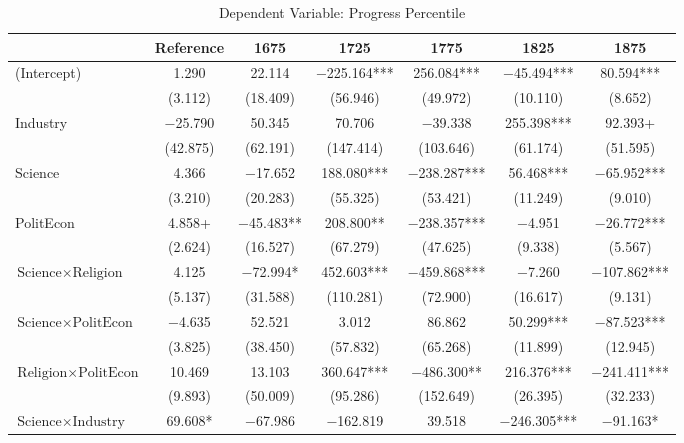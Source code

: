\begin{table}

\caption{Dependent Variable: Progress Percentile}
\centering
\begin{threeparttable}
\begin{tabular}[t]{lcccccc}
\toprule
  & Reference & 1675 & 1725 & 1775 & 1825 & 1875\\
\midrule
(Intercept) & \num{1.290} & \num{22.114} & \num{-225.164}*** & \num{256.084}*** & \num{-45.494}*** & \num{80.594}***\\
 & (\num{3.112}) & (\num{18.409}) & (\num{56.946}) & (\num{49.972}) & (\num{10.110}) & (\num{8.652})\\
Industry & \num{-25.790} & \num{50.345} & \num{70.706} & \num{-39.338} & \num{255.398}*** & \num{92.393}+\\
 & (\num{42.875}) & (\num{62.191}) & (\num{147.414}) & (\num{103.646}) & (\num{61.174}) & (\num{51.595})\\
Science & \num{4.366} & \num{-17.652} & \num{188.080}*** & \num{-238.287}*** & \num{56.468}*** & \num{-65.952}***\\
 & (\num{3.210}) & (\num{20.283}) & (\num{55.325}) & (\num{53.421}) & (\num{11.249}) & (\num{9.010})\\
PolitEcon & \num{4.858}+ & \num{-45.483}** & \num{208.800}** & \num{-238.357}*** & \num{-4.951} & \num{-26.772}***\\
 & (\num{2.624}) & (\num{16.527}) & (\num{67.279}) & (\num{47.625}) & (\num{9.338}) & (\num{5.567})\\
$\text{Science} \times \text{Religion}$ & \num{4.125} & \num{-72.994}* & \num{452.603}*** & \num{-459.868}*** & \num{-7.260} & \num{-107.862}***\\
 & (\num{5.137}) & (\num{31.588}) & (\num{110.281}) & (\num{72.900}) & (\num{16.617}) & (\num{9.131})\\
$\text{Science} \times \text{PolitEcon}$ & \num{-4.635} & \num{52.521} & \num{3.012} & \num{86.862} & \num{50.299}*** & \num{-87.523}***\\
 & (\num{3.825}) & (\num{38.450}) & (\num{57.832}) & (\num{65.268}) & (\num{11.899}) & (\num{12.945})\\
$\text{Religion} \times \text{PolitEcon}$ & \num{10.469} & \num{13.103} & \num{360.647}*** & \num{-486.300}** & \num{216.376}*** & \num{-241.411}***\\
 & (\num{9.893}) & (\num{50.009}) & (\num{95.286}) & (\num{152.649}) & (\num{26.395}) & (\num{32.233})\\
$\text{Science} \times \text{Industry}$ & \num{69.608}* & \num{-67.986} & \num{-162.819} & \num{39.518} & \num{-246.305}*** & \num{-91.163}*\\

\end{tabular}
\end{threeparttable}
\end{table}
